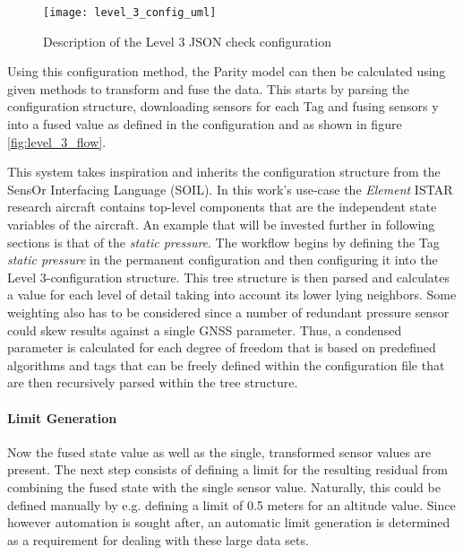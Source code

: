 \begin{figure}
    \centering
    \texttt{[image: level\_3\_config\_uml]}
    \caption{Description of the Level 3 JSON check configuration}
    \label{fig:level_3_config_uml}
\end{figure}

Using this configuration method, the Parity model can then be calculated using given methods to transform and fuse the data. This starts by parsing the configuration structure, downloading sensors for each Tag and fusing sensors y into a fused value as defined in the configuration and as shown in figure \ref{fig:level_3_flow}.



This system takes inspiration and inherits the configuration structure from the SensOr Interfacing Language (SOIL)\cite{behrens_domain-specific_2021}. In this work's use-case the \textit{Element} ISTAR research aircraft contains top-level components that are the independent state variables of the aircraft. An example that will be invested further in following sections is that of the \textit{static pressure}. The workflow begins by defining the Tag \textit{static pressure} in the permanent configuration and then configuring it into the Level 3-configuration structure. This tree structure is then parsed and calculates a value for each level of detail taking into account its lower lying neighbors. Some weighting also has to be considered since a number of redundant pressure sensor could skew results against a single GNSS parameter. Thus, a condensed parameter is calculated for each degree of freedom that is based on predefined algorithms and tags that can be freely defined within the configuration file that are then recursively parsed within the tree structure.

\paragraph{Limit Generation}
Now the fused state value as well as the single, transformed sensor values are present. The next step consists of defining a limit for the resulting residual from combining the fused state with the single sensor value. Naturally, this could be defined manually by e.g. defining a limit of 0.5 meters for an altitude value. Since however automation is sought after, an automatic limit generation is determined as a requirement for dealing with these large data sets.

